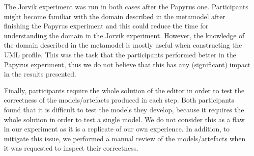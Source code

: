 The Jorvik experiment was run in both cases after the Papyrus one. Participants might become familiar with the domain described in the metamodel after finishing the Papyrus experiment and this could reduce the time for understanding the domain in the Jorvik experiment. However, the knowledge of the domain described in the metamodel is mostly useful when constructing the UML profile. This was the task that the participants performed better in the Papyrus experiment, thus we do not believe that this has any (significant) impact in the results presented.

Finally, participants require the whole solution of the editor in order to test the correctness of the models/artefacts produced in each step. Both participants found that it is difficult to test the models they develop, because it requires the whole solution in order to test a single model. We do not consider this as a flaw in our experiment as it is a replicate of our own experience.
In addition, to mitigate this issue, we performed a manual review of the models/artefacts when it was requested to inspect their correctness.
